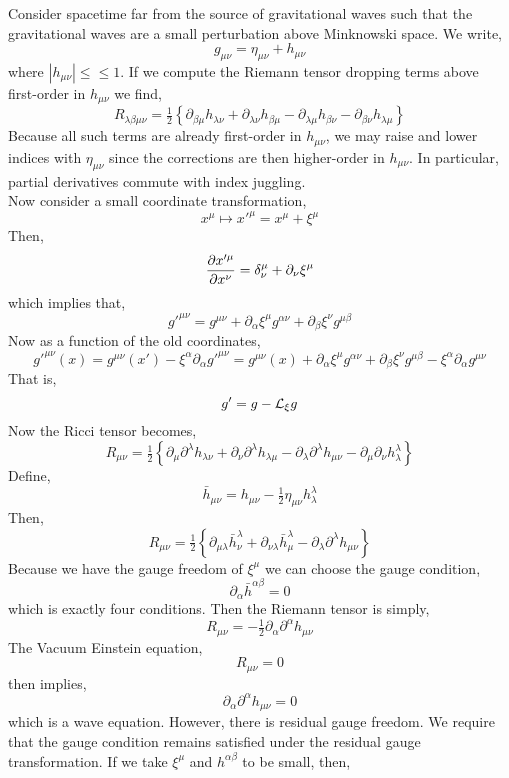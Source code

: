 \documentclass[11pt, a4paper]{article}
\begin{document}
Consider spacetime far from the source of gravitational waves such that the gravitational waves are a small perturbation above Minknowski space. We write,
\[ g_{\mu \nu} = \eta_{\mu \nu} + h_{\mu \nu} \]
where $| h_{\mu \nu} | \le \le 1$. If we compute the Riemann tensor dropping terms above first-order in $h_{\mu \nu}$ we find,
\[ R_{\lambda \beta \mu \nu} =  \tfrac{1}{2} \left\{ \partial_{\beta \mu} h_{\lambda \nu} + \partial_{\lambda \nu} h_{\beta \mu} - \partial_{\lambda \mu} h_{\beta \nu} - \partial_{\beta \nu} h_{\lambda \mu} \right\} \]
Because all such terms are already first-order in $h_{\mu \nu}$, we may raise and lower indices with $\eta_{\mu \nu}$ since the corrections are then higher-order in $h_{\mu \nu}$. In particular, partial derivatives commute with index juggling. 
\bigskip\\
Now consider a small coordinate transformation,
\[ x^\mu \mapsto x'^\mu = x^\mu + \xi^\mu \]
Then,
\[ \frac{\partial{x'^\mu}}{\partial{x^\nu}} = \delta^\mu_\nu + \partial_\nu \xi^\mu \]
which implies that,
\[ g'^{\mu \nu} =  g^{\mu \nu} +  \partial_\alpha \xi^\mu g^{\alpha \nu} +  \partial_\beta \xi^\nu g^{\mu \beta}  \]
Now as a function of the old coordinates,
\[ g'^{\mu \nu}(x) = g^{\mu \nu}(x') - \xi^\alpha \partial_\alpha g'^{\mu \nu} = g^{\mu \nu}(x) +  \partial_\alpha \xi^\mu g^{\alpha \nu} +  \partial_\beta \xi^\nu g^{\mu \beta} - \xi^\alpha \partial_\alpha g^{\mu \nu} \]
That is,
\[ g' = g - \mathcal{L}_{\xi} g \]
Now the Ricci tensor becomes,
\[ R_{\mu \nu} = \tfrac{1}{2} \left\{ \partial_{\mu} \partial^\lambda h_{\lambda \nu} + \partial_\nu \partial^\lambda h_{\lambda \mu} - \partial_\lambda \partial^\lambda h_{\mu \nu} - \partial_{\mu} \partial_\nu h^\lambda_\lambda \right\} \]
Define,
\[ \bar{h}_{\mu \nu} = h_{\mu \nu} - \tfrac{1}{2} \eta_{\mu \nu} h^\lambda_\lambda \]
Then,
\[ R_{\mu \nu} = \tfrac{1}{2} \left\{ \partial_{\mu \lambda} \bar{h}^\lambda_\nu + \partial_{\nu \lambda} \bar{h}^\lambda_\mu - \partial_\lambda \partial^\lambda h_{\mu \nu} \right\} \]
Because we have the gauge freedom of $\xi^\mu$ we can choose the gauge condition,
\[ \partial_\alpha \bar{h}^{\alpha \beta} = 0 \]
which is exactly four conditions. Then the Riemann tensor is simply,
\[ R_{\mu \nu} = - \tfrac{1}{2} \partial_\alpha \partial^\alpha h_{\mu \nu} \] 
The Vacuum Einstein equation,
\[ R_{\mu \nu} = 0 \]
then implies,
\[ \partial_\alpha \partial^\alpha h_{\mu \nu} = 0 \]
which is a wave equation. However, there is residual gauge freedom. We require that the gauge condition remains satisfied under the residual gauge transformation. If we take $\xi^\mu$ and $h^{\alpha \beta}$ to be small, then,
\end{document}
